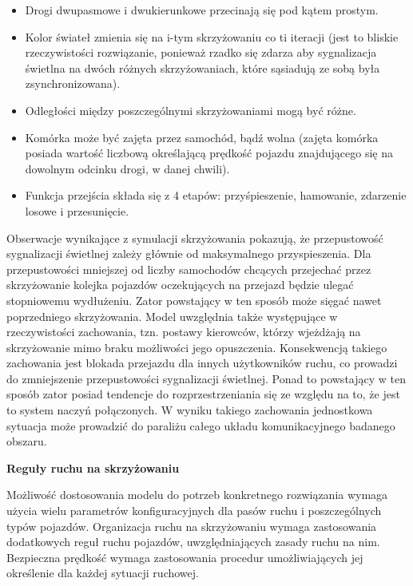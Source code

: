 \documentclass{sprawozdanie-agh}
\begin{document}
\begin{multicols}{2}
		\begin{itemize}
			\item Drogi dwupasmowe i dwukierunkowe przecinają się pod kątem prostym.
			\item Kolor świateł zmienia się na i-tym skrzyżowaniu co ti iteracji (jest to bliskie rzeczywistości rozwiązanie, ponieważ rzadko się zdarza aby sygnalizacja świetlna na dwóch różnych skrzyżowaniach, które sąsiadują ze sobą była zsynchronizowana).
			\item Odległości między poszczególnymi skrzyżowaniami mogą być różne.
			\item Komórka może być zajęta przez samochód, bądź wolna (zajęta komórka posiada wartość liczbową określającą prędkość pojazdu znajdującego się na dowolnym odcinku drogi, w danej chwili).
			\item Funkcja przejścia składa się z 4 etapów: przyśpieszenie, hamowanie, zdarzenie losowe i przesunięcie.
		\end{itemize}

		Obserwacje wynikające z symulacji skrzyżowania pokazują, że przepustowość sygnalizacji świetlnej zależy głównie od maksymalnego przyspieszenia. Dla przepustowości mniejszej od liczby samochodów chcących przejechać przez skrzyżowanie kolejka pojazdów oczekujących na przejazd będzie ulegać stopniowemu wydłużeniu. Zator powstający w ten sposób może sięgać nawet poprzedniego skrzyżowania. Model uwzględnia także występujące w rzeczywistości zachowania, tzn. postawy kierowców, którzy wjeżdżają na skrzyżowanie mimo braku możliwości jego opuszczenia. Konsekwencją takiego zachowania jest blokada przejazdu dla innych użytkowników ruchu, co prowadzi do zmniejszenie przepustowości sygnalizacji świetlnej. Ponad to powstający w ten sposób zator posiad tendencje do rozprzestrzeniania się ze względu na to, że jest to system naczyń połączonych. W wyniku takiego zachowania jednostkowa sytuacja może prowadzić do paraliżu całego układu komunikacyjnego badanego obszaru.

		\parskip=10pt
		\textbf {Reguły ruchu na skrzyżowaniu}

		Możliwość dostosowania modelu do potrzeb konkretnego rozwiązania wymaga użycia wielu parametrów konfiguracyjnych dla pasów ruchu i poszczególnych typów pojazdów. Organizacja ruchu na skrzyżowaniu wymaga zastosowania dodatkowych reguł ruchu pojazdów, uwzględniających zasady ruchu na nim. Bezpieczna prędkość wymaga zastosowania procedur umożliwiających jej określenie dla każdej sytuacji ruchowej.


\end{multicols}
\end{document}
